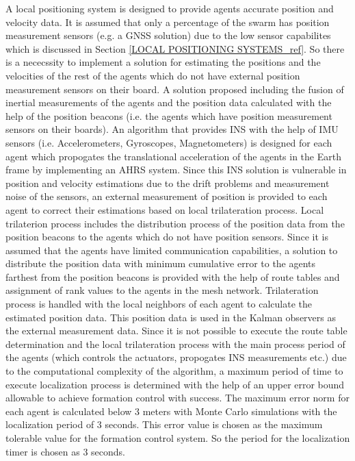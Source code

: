 A	local positioning system is designed to provide agents accurate position and velocity data. It is assumed that only a percentage of the swarm has position measurement sensors (e.g. a GNSS solution) due to the low sensor capabilites which is discussed in Section \ref{LOCAL POSITIONING SYSTEMS_ref}. So there is a nececssity to implement a solution for estimating the positions and the velocities of the rest of the agents which do not have external position measurement sensors on their board.  A solution proposed including the fusion of inertial measurements of the agents and the position data calculated with the help of the position beacons (i.e. the agents which have position measurement sensors on their boards). An algorithm that provides INS with the help of IMU sensors (i.e. Accelerometers, Gyroscopes, Magnetometers) is designed for each agent which propogates the translational acceleration of the agents in the Earth frame by implementing an AHRS system. Since this INS solution is vulnerable in position and velocity estimations due to the drift problems and measurement noise of the sensors, an external measurement of position is provided to each agent to correct their estimations based on local trilateration process. Local trilaterion process includes the distribution process of the position data from the position beacons to the agents which do not have position sensors. Since it is assumed that the agents have limited communication capabilities, a solution to distribute the position data with minimum cumulative error to the agents farthest from the position beacons is provided with the help of route tables and assignment of rank values to the agents in the mesh network. Trilateration process is handled with the local neighbors of each agent to calculate the estimated position data. This position data is used in the Kalman observers as the external measurement data. Since it is not possible to execute the route table determination and the local trilateration process with the main process period of the agents (which controls the actuators, propogates INS measurements etc.) due to the computational complexity of the algorithm, a maximum period of time to execute localization process is determined with the help of an upper error bound allowable to achieve formation control with success. The maximum error norm for each agent is calculated below 3 meters with Monte Carlo simulations with the localization period of 3 seconds. This error value is chosen as the maximum tolerable value for the formation control system. So the period for the localization timer is chosen as 3 seconds.
       
